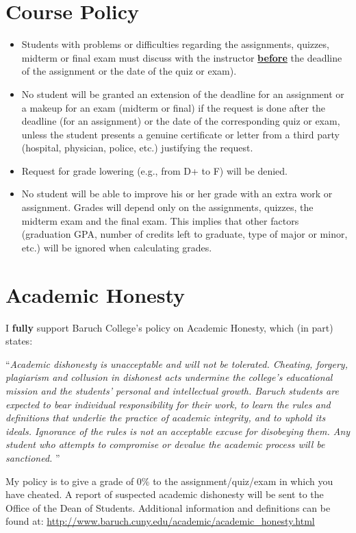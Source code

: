 \documentclass[12]{article}
\begin{document}
\section*{Course Policy}
\begin{itemize}
\item Students with problems or difficulties regarding the
  assignments, quizzes, midterm or final exam must discuss with the instructor
  \underline{\textbf{before}} the deadline of the assignment or the date
  of the quiz or exam).
\item No student will be granted an extension of the deadline for an
  assignment or a makeup for an exam (midterm or final) if the request
  is done after the deadline (for an assignment) or the date of the corresponding 
  quiz or exam, unless the student presents a
  genuine certificate or letter from a third party (hospital,
  physician, police, etc.) justifying the request. 
\item Request for grade lowering  (e.g., from D+ to F) will be
  denied. 
\item No student will be able to improve his or her grade with an
  extra work or assignment. Grades will depend only on the
  assignments, quizzes, the midterm exam and the final exam. This implies that other factors (graduation GPA, number of credits left to graduate, type of major or minor, etc.) will be ignored when calculating grades. 
\end{itemize}



\section*{Academic Honesty}

I \textbf{fully} support Baruch College's policy on Academic Honesty, which (in part) states: 

``{\it Academic dishonesty is unacceptable and will not be tolerated. Cheating, forgery, plagiarism and collusion in dishonest acts undermine the college's educational mission and the students' personal and intellectual growth. Baruch students are expected to bear individual responsibility for their work, to learn the rules and definitions that underlie the practice of academic integrity, and to uphold its ideals. Ignorance of the rules is not an acceptable excuse for disobeying them. Any student who attempts to compromise or devalue the academic process will be sanctioned. }''

My policy is to give a grade of 0\% to the assignment/quiz/exam in which you have cheated.  
A report of suspected academic dishonesty will be sent to the Office
of the Dean of Students.
\newline
\newline
Additional information and definitions can be found at:
\newline
\href{https://www.baruch.cuny.edu/academic/academic_honesty.html}{http://www.baruch.cuny.edu/academic/academic\_honesty.html}
\end{document}

